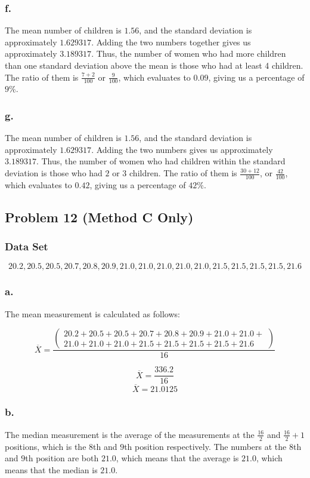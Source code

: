 \documentclass[11pt]{article}
\begin{document}
\subsubsection*{f.}
The mean number of children is $1.56$, and the standard deviation is
approximately $1.629317$. Adding the two numbers together gives us approximately
$3.189317$. Thus, the number of women who had more children than one
standard deviation above the mean is those who had at least 4 children. The
ratio of them is $\frac{7+2}{100}$ or $\frac{9}{100}$, which evaluates to
$0.09$, giving us a percentage of $9\%$.

\subsubsection*{g.}
The mean number of children is $1.56$, and the standard deviation is
approximately $1.629317$. Adding the two numbers gives us approximately
$3.189317$. Thus, the number of women who had children within the standard
deviation is those who had $2$ or $3$ children. The ratio of them is
$\frac{30+12}{100}$, or $\frac{42}{100}$, which evaluates to $0.42$, giving us a
percentage of $42\%$. 

\subsection*{Problem 12 (Method C Only)} %
\subsubsection*{Data Set}
\[
    20.2, 20.5, 20.5, 20.7, 20.8, 20.9, 21.0,21.0, 21.0, 21.0, 21.0, 21.5, 21.5,
    21.5, 21.5, 21.6
\]
\subsubsection*{a.}
The mean measurement is calculated as follows:

\[\overline{X} = \frac{\left(
    \begin{array}{c}
        20.2+20.5+20.5+20.7+20.8+20.9+21.0+21.0+\\
        21.0+21.0+21.0+21.5+21.5+21.5+21.5+21.6
    \end{array}
\right)}{16}\]

\[\overline{X} = \frac{336.2}{16}\]
\[\overline{X} = 21.0125\]

\subsubsection*{b.}
The median measurement is the average of the measurements at the $\frac{16}{2}$
and $\frac{16}{2}+1$ positions, which is the $8$th and $9$th position
respectively. The numbers at the $8$th and $9$th position are both $21.0$, which
means that the average is $21.0$, which means that the median is $21.0$. 
\end{document}
